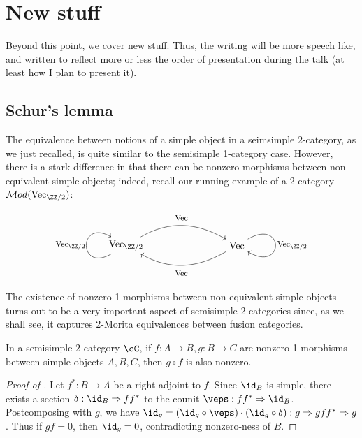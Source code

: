\documentclass[12pt]{article}
\newcommand{\Mod}{{\mathcal{M}od}}
\newcommand{\Vect}{{\textrm{Vec}}}
\begin{document}
\section{New stuff}

Beyond this point, we cover new stuff.
Thus, the writing will be more speech like,
and written to reflect more or less the order of presentation
during the talk (at least how I plan to present it).


\subsection{Schur's lemma}

The equivalence between notions of a simple object
in a seimsimple 2-category,
as we just recalled,
is quite similar to the semisimple 1-category case.
However, there is a stark difference in that
there can be nonzero morphisms between
non-equivalent simple objects;
indeed, recall our running example of a 2-category
$\Mod(\Vect_{\ZZ/2})$:

\[
\begin{tikzpicture}
\node (a) at (0,0) {$\Vect_{\ZZ/2}$};
\node (b) at (4,0) {$\Vect$};
\draw[->] (a) to[out=30,in=150] (b);
\node at (2,1) {\footnotesize $\Vect$};
\draw[->] (b) to[out=-150,in=-30] (a);
\node at (2,-1) {\footnotesize $\Vect$};
\draw[->] (a) .. controls +(-150:2cm) and +(150:2cm) .. (a);
\node at (-2,0) {\footnotesize $\Vect_{\ZZ/2}$};
\draw[->] (b) .. controls +(30:2cm) and +(-30:2cm) .. (b);
\node at (6,0) {\footnotesize $\Vect_{\ZZ/2}$};
\end{tikzpicture}
\]


The existence of nonzero 1-morphisms
between non-equivalent simple objects
turns out to be a very important aspect of semisimple 2-categories
since, as we shall see,
it captures 2-Morita equivalences between fusion categories.

\begin{proposition}
\label{p:schur-lemma}
In a semisimple 2-category $\cC$,
if $f: A \to B, g: B \to C$ are nonzero 1-morphisms
between simple objects $A,B,C$,
then $g \circ f$ is also nonzero.
\end{proposition}

\begin{proof}[Proof of ]
Let $f^*: B \to A$ be a right adjoint to $f$.
Since $\id_B$ is simple, there exists a section
$\delta: \id_B \Rightarrow ff^*$
to the counit $\veps: ff^* \Rightarrow \id_B$.
Postcomposing with $g$,
we have $\id_g = (\id_g \circ \veps) \cdot (\id_g \circ \delta):
g \Rightarrow gff^* \Rightarrow g$.
Thus if $gf = 0$, then $\id_g = 0$,
contradicting nonzero-ness of $B$.
\end{proof}
\end{document}
